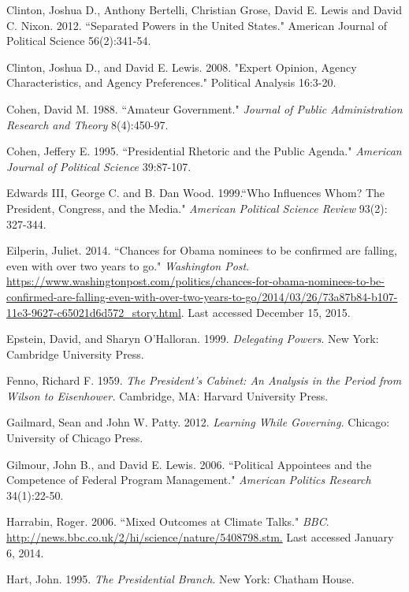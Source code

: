 \documentclass[12pt]{article}
\begin{document}
\noindent \hangindent=0.7cm Clinton, Joshua D., Anthony Bertelli, Christian Grose, David E. Lewis and David C. Nixon. 2012. ``Separated Powers in the United States." American Journal of Political Science 56(2):341-54.

\noindent \hangindent=0.7cm Clinton, Joshua D., and David E. Lewis. 2008. "Expert Opinion, Agency Characteristics, and Agency Preferences." Political Analysis 16:3-20.

\noindent \hangindent=0.7cm Cohen, David M. 1988. ``Amateur Government." \textit{Journal of Public Administration Research and Theory} 8(4):450-97. 

\noindent \hangindent=0.7cm Cohen, Jeffery E. 1995. ``Presidential Rhetoric and the Public Agenda." \textit{American Journal of Political Science} 39:87-107. 

\noindent \hangindent=0.7cm Edwards III, George C. and B. Dan Wood. 1999.``Who Influences Whom? The President, Congress, and the Media." \textit{American Political Science Review} 93(2): 327-344.

\noindent \hangindent=0.7cm Eilperin, Juliet. 2014. ``Chances for Obama nominees to be confirmed are falling, even with over two years to go." \textit{Washington Post}. \url{https://www.washingtonpost.com/politics/chances-for-obama-nominees-to-be-confirmed-are-falling-even-with-over-two-years-to-go/2014/03/26/73a87b84-b107-11e3-9627-c65021d6d572_story.html}. Last accessed December 15, 2015. 

\noindent \hangindent=0.7cm Epstein, David, and Sharyn O'Halloran. 1999. \textit{Delegating Powers}. New York: Cambridge University Press. 

\noindent \hangindent=0.7cm Fenno, Richard F. 1959. \textit{The President's Cabinet: An Analysis in the Period from Wilson to Eisenhower.} Cambridge, MA: Harvard University Press.

\noindent \hangindent=0.7cm Gailmard, Sean and John W. Patty. 2012. \textit{Learning While Governing.} Chicago: University of Chicago Press. 

\noindent \hangindent=0.7cm Gilmour, John B., and David E. Lewis. 2006. ``Political Appointees and the Competence of Federal Program Management." \textit{American Politics Research} 34(1):22-50. 

\noindent \hangindent=0.7cm Harrabin, Roger. 2006.  ``Mixed Outcomes at Climate Talks." \textit{BBC}. \url{http://news.bbc.co.uk/2/hi/science/nature/5408798.stm.} Last accessed January 6, 2014.

\noindent \hangindent=0.7cm Hart, John. 1995. \textit{The Presidential Branch}.  New York: Chatham House.
\end{document}
